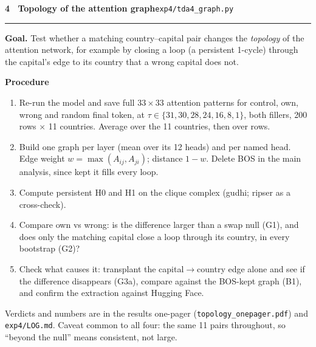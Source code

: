 \documentclass[10pt]{article}
\newcommand{\analysis}[3]{%
  \vspace{5pt}
  {\large\bfseries #1}\hfill{\color{muted}\footnotesize #2}\\[-3pt]\rule{\linewidth}{0.5pt}\par
  \colorbox{plane}{\parbox{\dimexpr\linewidth-2\fboxsep}{\small\textbf{Goal.} #3}}\par\vspace{1pt}
  {\small\textbf{Procedure}}\par\small}
\begin{document}
\analysis{4 \textperiodcentered\ Topology of the attention graph}{\texttt{exp4/tda4\_graph.py}}
{Test whether a matching country--capital pair changes the \emph{topology} of the attention network, for example by
closing a loop (a persistent 1-cycle) through the capital's edge to its country that a wrong capital does not.}
\begin{enumerate}
\item Re-run the model and save full $33\times33$ attention patterns for control, own, wrong and random final token,
  at $\tau \in \{31,30,28,24,16,8,1\}$, both fillers, 200 rows $\times$ 11 countries. Average over the 11 countries,
  then over rows.
\item Build one graph per layer (mean over its 12 heads) and per named head. Edge weight
  $w = \max(A_{ij}, A_{ji})$; distance $1-w$. Delete BOS in the main analysis, since kept it fills every loop.
\item Compute persistent H0 and H1 on the clique complex (gudhi; ripser as a cross-check).
\item Compare own vs wrong: is the difference larger than a swap null (G1), and does only the matching capital close a
  loop through its country, in every bootstrap (G2)?
\item Check what causes it: transplant the capital$\to$country edge alone and see if the difference disappears
  (G3a), compare against the BOS-kept graph (B1), and confirm the extraction against Hugging Face.
\end{enumerate}

\vfill
{\scriptsize\color{muted} Verdicts and numbers are in the results one-pager (\texttt{topology\_onepager.pdf}) and
\texttt{exp4/LOG.md}. Caveat common to all four: the same 11 pairs throughout, so ``beyond the null'' means
consistent, not large.}
\end{document}
